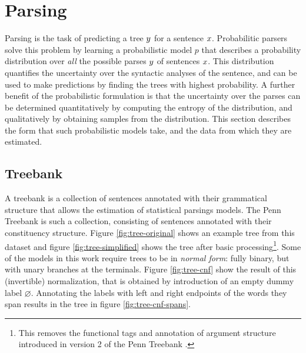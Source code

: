 % 		  
%
% 		  
%

\section{Parsing}
  Parsing is the task of predicting a tree $y$ for a sentence $x$. Probabilitic parsers solve this problem by learning a probabilistic model $p$ that describes a probability distribution over \textit{all} the possible parses $y$ of sentences $x$. This distribution quantifies the uncertainty over the syntactic analyses of the sentence, and can be used to make predictions by finding the trees with highest probability. A further benefit of the probabilistic formulation is that the uncertainty over the parses can be determined quantitatively by computing the entropy of the distribution, and qualitatively by obtaining samples from the distribution. This section describes the form that such probabilistic models take, and the data from which they are estimated.

  \subsection{Treebank}
    A treebank is a collection of sentences annotated with their grammatical structure that allows the estimation of statistical parsings models. The Penn Treebank \citep{marcus1993penn} is such a collection, consisting of sentences annotated with their constituency structure. Figure \ref{fig:tree-original} shows an example tree from this dataset and figure \ref{fig:tree-simplified} shows the tree after basic processing\footnote{This removes the functional tags and annotation of argument structure introduced in version 2 of the Penn Treebank \citep{marcus1994annotating}.}. Some of the models in this work require trees to be in \textit{normal form}: fully binary, but with unary branches at the terminals. Figure \ref{fig:tree-cnf} show the result of this (invertible) normalization, that is obtained by introduction of an empty dummy label $\varnothing$. Annotating the labels with left and right endpoints of the words they span results in the tree in figure \ref{fig:tree-cnf-spans}.

